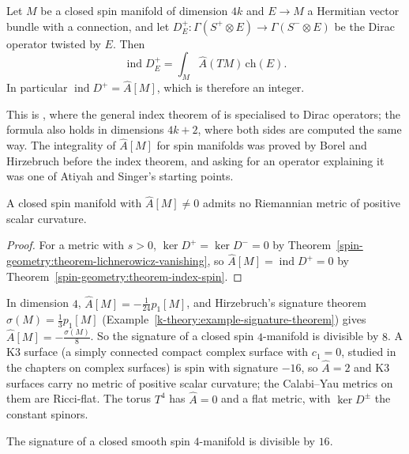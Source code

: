 \begin{theorem}\label{spin-geometry:theorem-index-spin}
Let $M$ be a closed spin manifold of dimension $4k$ and $E \to M$ a Hermitian vector bundle with a connection, and let $D_E^+ \colon \Gamma(S^+ \otimes E) \to \Gamma(S^- \otimes E)$ be the Dirac operator twisted by $E$. Then
\[
\operatorname{ind}D_E^+ = \int_M\hat{A}(TM)\,\mathrm{ch}(E).
\]
In particular $\operatorname{ind}D^+ = \hat{A}[M]$, which is therefore an integer.
\end{theorem}

This is \cite{atiyah-singer-1968-3}, where the general index theorem of \cite{atiyah-singer-1968-1} is specialised to Dirac operators; the formula also holds in dimensions $4k + 2$, where both sides are computed the same way.
The integrality of $\hat{A}[M]$ for spin manifolds was proved by Borel and Hirzebruch before the index theorem, and asking for an operator explaining it was one of Atiyah and Singer's starting points.

\begin{corollary}[Lichnerowicz]\label{spin-geometry:corollary-psc-obstruction}
A closed spin manifold with $\hat{A}[M] \neq 0$ admits no Riemannian metric of positive scalar curvature.
\end{corollary}

\begin{proof}
For a metric with $s > 0$, $\ker D^+ = \ker D^- = 0$ by Theorem~\ref{spin-geometry:theorem-lichnerowicz-vanishing}, so $\hat{A}[M] = \operatorname{ind}D^+ = 0$ by Theorem~\ref{spin-geometry:theorem-index-spin}.
\end{proof}

\begin{example}\label{spin-geometry:example-four-dimensions}
In dimension $4$, $\hat{A}[M] = -\frac{1}{24}p_1[M]$, and Hirzebruch's signature theorem $\sigma(M) = \frac13p_1[M]$ (Example~\ref{k-theory:example-signature-theorem}) gives $\hat{A}[M] = -\frac{\sigma(M)}{8}$. So the signature of a
closed spin $4$-manifold is divisible by $8$. A K3 surface (a simply connected compact complex surface with $c_1 = 0$, studied in the chapters on complex surfaces) is spin with signature $-16$, so $\hat{A} = 2$ and K3 surfaces
carry no metric of positive scalar curvature; the Calabi--Yau metrics on them are Ricci-flat. The torus $T^4$ has $\hat{A} = 0$ and a flat metric, with $\ker D^\pm$ the constant spinors.
\end{example}

\begin{theorem}[Rokhlin]\label{spin-geometry:theorem-rokhlin}
The signature of a closed smooth spin $4$-manifold is divisible by $16$.
\end{theorem}


